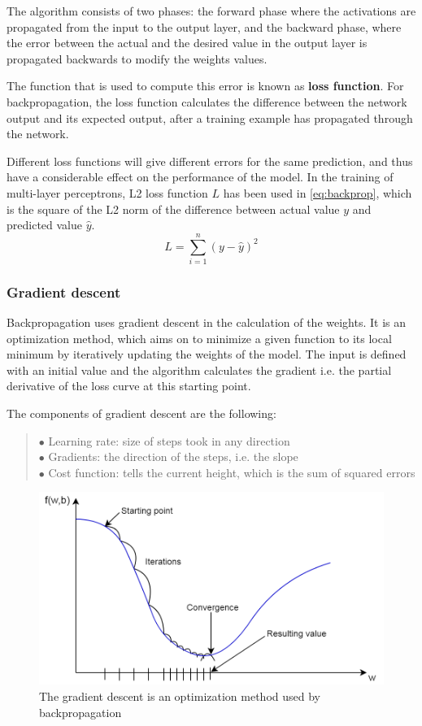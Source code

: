 The algorithm consists of two phases: the forward phase where the activations are propagated from the input to the output layer, and the backward phase, where the error between the actual and the desired value in the output layer is propagated backwards to modify the weights values. \medskip

The function that is used to compute this error is known as \textbf{loss function}. For backpropagation, the loss function calculates the difference between the network output and its expected output, after a training example has propagated through the network. \medskip

Different loss functions will give different errors for the same prediction, and thus have a considerable effect on the performance of the model. In the training of multi-layer perceptrons, L2 loss function $L$ has been used in \eqref{eq:backprop}, which is the square of the L2 norm of the difference between actual value $y$ and predicted value $\hat{y}$.
\begin{equation} L = \sum^n_{i=1}(y - \hat{y})^2 \label{eq:backprop} \end{equation}



\subsubsection{Gradient descent}

Backpropagation uses gradient descent \cite{anderson1995introduction} in the calculation of the weights. It is an optimization method, which aims on to minimize a given function to its local minimum by iteratively updating the weights of the model. The input is defined with an initial value and the algorithm calculates the gradient i.e. the partial derivative of the loss curve at this starting point. \medskip

\noindent The components of gradient descent are the following:
\begin{verse}
	$\bullet$ Learning rate: size of steps took in any direction\\
	$\bullet$ Gradients: the direction of the steps, i.e. the slope\\
	$\bullet$ Cost function: tells the current height, which is the sum of squared errors
\end{verse}

\begin{figure}[h]
	\centering
	\includegraphics[height=0.35\linewidth]{./figures/gradient}
	\caption{The gradient descent is an optimization method used by backpropagation}
	\label{fig:gradient}
\end{figure}

